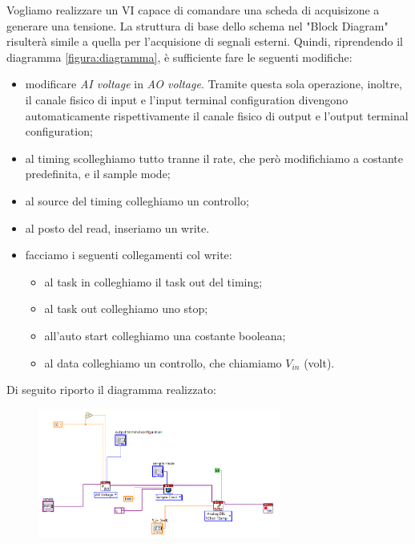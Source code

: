 Vogliamo realizzare un VI capace di comandare una scheda di acquisizone a generare una tensione. La struttura di base dello schema nel "Block Diagram" risulterà simile a quella per l'acquisione di segnali esterni. Quindi, riprendendo il diagramma \ref{figura:diagramma}, è sufficiente fare le seguenti modifiche:
\begin{itemize}
    \item modificare \textit{AI voltage} in \textit{AO voltage}. Tramite questa sola operazione, inoltre, il canale fisico di input e l'input terminal configuration divengono automaticamente rispettivamente il canale fisico di output e l'output terminal configuration;
    \item al timing scolleghiamo tutto tranne il rate, che però modifichiamo a costante predefinita, e il sample mode;
    \item al source del timing colleghiamo un  controllo;
    \item al posto del read, inseriamo un write.
    \item facciamo i seguenti collegamenti col write:
    \begin{itemize}
        \item al task in colleghiamo il task out del timing;
        \item al task out colleghiamo uno stop;
        \item all'auto start colleghiamo una costante booleana;
        \item al data colleghiamo un controllo, che chiamiamo $V_{in}$ (volt).
    \end{itemize}
\end{itemize}
Di seguito riporto il diagramma realizzato:
\begin{figure}[H]
\caption{}
    \includegraphics[width=8cm]{settimana_1/immagini/MXVOUT.png}
    \centering
\end{figure}


